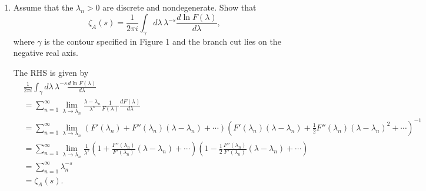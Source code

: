 \begin{enumerate}[label=\alph*)]
    In cases where the eigenvalues cannot be obtained explicitly, suppose one
    can construct $F(\lambda)$ whose zeros are precisely the eigenvalues of $A$.

    \item Assume that the $\lambda_n>0$ are discrete and nondegenerate. Show that
    \begin{equation}
        \zeta_A(s)
        =\frac{1}{2\pi i}
        \int_\gamma d\lambda\,
        \lambda^{-s}
        \frac{d\ln F(\lambda)}{d\lambda},
    \end{equation}
    where $\gamma$ is the contour specified in Figure 1 and the branch cut lies
    on the negative real axis.
    \begin{solution}
        The RHS is given by
        \begin{equation}
            \begin{aligned}
                &\frac{1}{2\pi i}
        \int_\gamma d\lambda\,
        \lambda^{-s}
        \frac{d\ln F(\lambda)}{d\lambda}\\
        &= \sum_{n=1}^\infty
        \lim_{\lambda\to\lambda_n} \frac{\lambda-\lambda_n}{\lambda^s}\frac{1}{F(\lambda)}\frac{d F(\lambda)}{d\lambda}\\
        &=\sum_{n=1}^\infty
        \lim_{\lambda\to\lambda_n}\left(F'(\lambda_n) + F''(\lambda_n)(\lambda-\lambda_n) + \cdots \right)\left(F'(\lambda_n)(\lambda-\lambda_n) + \frac12F''(\lambda_n)(\lambda-\lambda_n)^2 + \cdots \right)^{-1}\\
        &=\sum_{n=1}^\infty
        \lim_{\lambda\to\lambda_n}\frac{1}{\lambda^s}\left(1+ \frac{F''(\lambda_n)}{F'(\lambda_n)}(\lambda-\lambda_n) +\cdots\right)\left(1- \frac12\frac{F''(\lambda_n)}{F'(\lambda_n)}(\lambda-\lambda_n) +\cdots\right)\\
        &=\sum_{n=1}^\infty \lambda_n^{-s}\\
        &= \zeta_A(s).
            \end{aligned}
        \end{equation}
    \end{solution}


\end{enumerate}

